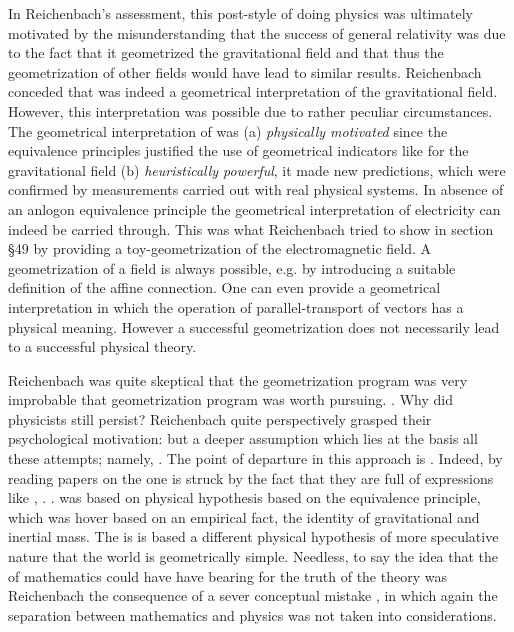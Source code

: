 \documentclass[draft]{article}
\newcommand{\PRZL}{\citetitle{Reichenbach1928}\xspace}
\begin{document}
In Reichenbach's assessment, this post-\grc style of doing physics was ultimately motivated by the misunderstanding that the success of general relativity was due to the fact that it geometrized the gravitational field and that thus the geometrization of other fields would have lead to similar results. Reichenbach conceded that \gr was indeed a geometrical interpretation of the gravitational field. However, this interpretation was possible due to rather peculiar circumstances. The geometrical interpretation of \rt was (a) \emph{physically motivated} since the equivalence principles justified the use of geometrical indicators like \rac for the gravitational field (b) \emph{heuristically powerful}, it made new predictions, which were confirmed by measurements carried out with real physical systems. In absence of an anlogon equivalence principle the geometrical interpretation of electricity can indeed be carried through. This was what Reichenbach tried to show in section \S49 by providing a toy-geometrization of the electromagnetic field. A geometrization of a field is always possible, e.g. by introducing a suitable definition of the affine connection. One can even provide a geometrical interpretation in which the operation of parallel-transport of vectors has a physical meaning. However a successful geometrization does not necessarily lead to a successful physical theory. 

Reichenbach was quite skeptical that the geometrization program was very improbable that geometrization program was worth pursuing. . Why did physicists still persist? Reichenbach quite perspectively grasped their psychological motivation:  but a deeper assumption which lies at the basis all these attempts; namely, . The point of departure in this approach is . Indeed, by reading papers on the \uft one is struck by the fact that they are full of expressions like , \etc. . \Gr was based on physical hypothesis based on the equivalence principle, which was hover based on an empirical fact, the identity of gravitational and inertial mass. The \uftp is is based a different physical hypothesis of more speculative nature that the world is geometrically simple. Needless, to say the idea that the  of mathematics could have have bearing for the truth of the theory was Reichenbach the consequence of a sever conceptual mistake \PRZL{**}{**}, in which again the separation between mathematics and physics was not taken into considerations.
\end{document}
